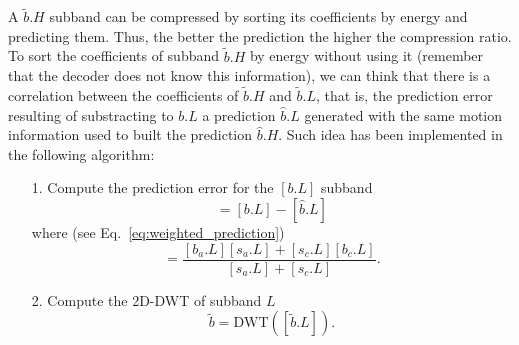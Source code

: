A $\tilde{b}.H$ subband can be compressed by sorting its coefficients
by energy and predicting them. Thus, the better the prediction the
higher the compression ratio. To sort the coefficients of subband
$\tilde{b}.H$ by energy without using it (remember that the decoder
does not know this information), we can think that there is a
correlation between the coefficients of $\tilde{b}.H$ and
$\tilde{b}.L$, that is, the prediction error resulting of substracting
to $b.L$ a prediction $\hat{b}.L$ generated with the same motion
information used to built the prediction $\hat{b}.H$. Such idea has
been implemented in the following algorithm:
\begin{enumerate}
\item [1.] Compute the prediction error for the $[b.L]$ subband
\begin{equation}
  [\tilde{b}.L] = [b.L] - [\hat{b}.L]
\end{equation}
where (see Eq.~\ref{eq:weighted_prediction})
\begin{equation}
  [\hat{b}.L] = \frac{[b_a.L][s_a.L]+[s_c.L][b_c.L]}{[s_a.L]+[s_c.L]}.
\end{equation}

\item [2.] Compute the 2D-DWT of subband $L$
  \begin{equation}
    \tilde{b}=\text{DWT}([\tilde{b}.L]).
  \end{equation}


\end{enumerate}
